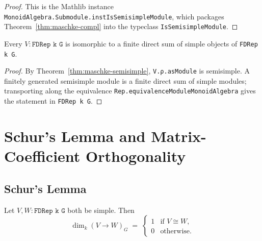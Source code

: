 \begin{proof}
  \leanok
  This is the Mathlib instance \texttt{MonoidAlgebra.Submodule.instIsSemisimpleModule},
  which packages Theorem~\ref{thm:maschke-compl} into the typeclass
  \texttt{IsSemisimpleModule}.
\end{proof}

\begin{corollary}
  \label{cor:fd-rep-decomposition}
  Every $V : \texttt{FDRep k G}$ is isomorphic to a finite direct sum of simple
  objects of \texttt{FDRep k G}.
\end{corollary}

\begin{proof}
  By Theorem~\ref{thm:maschke-semisimple}, \texttt{V.ρ.asModule} is semisimple.
  A finitely generated semisimple module is a finite direct sum of simple
  modules; transporting along the equivalence
  \texttt{Rep.equivalenceModuleMonoidAlgebra} gives the statement in
  \texttt{FDRep k G}.
\end{proof}


\chapter{Schur's Lemma and Matrix-Coefficient Orthogonality}
\label{chap:schur}

\section{Schur's Lemma}

\begin{theorem}
  \label{thm:schur-dim}
  \mathlibok
  Let $V, W : \texttt{FDRep k G}$ both be simple. Then
  \[
    \dim_k(V \to W)_G \;=\;
    \begin{cases} 1 & \text{if } V \cong W,\\ 0 & \text{otherwise.} \end{cases}
  \]
\end{theorem}

